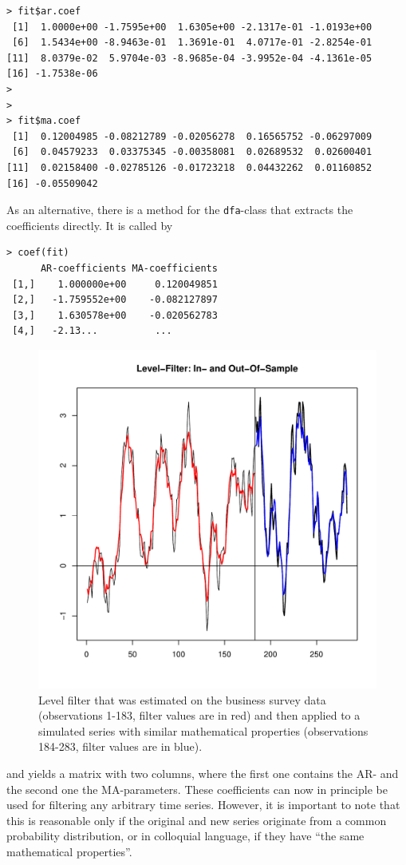 \documentclass[a4paper]{article}
\begin{document}
\begin{verbatim}
> fit$ar.coef
 [1]  1.0000e+00 -1.7595e+00  1.6305e+00 -2.1317e-01 -1.0193e+00
 [6]  1.5434e+00 -8.9463e-01  1.3691e-01  4.0717e-01 -2.8254e-01
[11]  8.0379e-02  5.9704e-03 -8.9685e-04 -3.9952e-04 -4.1361e-05
[16] -1.7538e-06
>
>
> fit$ma.coef
 [1]  0.12004985 -0.08212789 -0.02056278  0.16565752 -0.06297009
 [6]  0.04579233  0.03375345 -0.00358081  0.02689532  0.02600401
[11]  0.02158400 -0.02785126 -0.01723218  0.04432262  0.01160852
[16] -0.05509042
\end{verbatim}
As an alternative, there is a method for the \texttt{dfa}-class that
extracts the coefficients directly. It is called by
\begin{verbatim}
> coef(fit)
      AR-coefficients MA-coefficients
 [1,]    1.000000e+00     0.120049851
 [2,]   -1.759552e+00    -0.082127897
 [3,]    1.630578e+00    -0.020562783
 [4,]   -2.13...          ... 
\end{verbatim}
\begin{figure}[htb!] 
\begin{center}
\includegraphics[width=1.5\textwidth]{level_in_and_outofsample}
\caption{Level filter that was estimated on the business survey data
  (observations 1-183, filter values are in red) and then applied to a
  simulated series with similar mathematical properties (observations
  184-283, filter values are in blue).\label{fig5}}
\end{center}
\end{figure}
and yields a matrix with two columns, where the first one contains the
AR- and the second one the MA-parameters. These coefficients can now
in principle be used for filtering any arbitrary time series. 
However, it is important to note that this is reasonable only if the
original and new series originate from a common probability
distribution, or in colloquial language, if they have ``the same
mathematical properties''. \\
\end{document}
